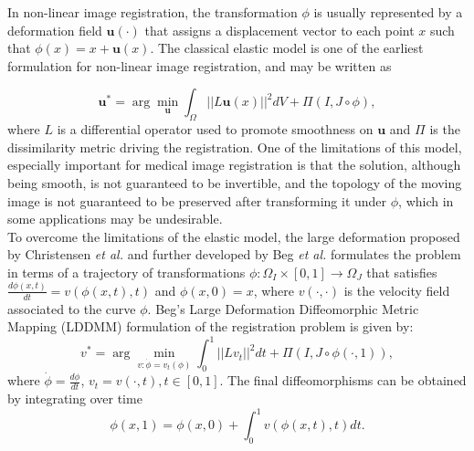 In non-linear image registration, the transformation $\phi$ is usually represented by a deformation field $\mathbf{u(\cdot)}$ that assigns a displacement vector
to each point $x$ such that $\phi(x) = x + \mathbf{u}(x)$. The classical elastic model is one of the earliest formulation for non-linear image registration,
and may be written as

\begin{equation}\label{eq:elastic}
    \mathbf{u}^{*} = \arg \min_{\mathbf{u}} \int_{\Omega} ||L \mathbf{u}(x)||^{2}dV + \Pi(I, J \circ \phi),
\end{equation}
where $L$ is a differential operator used to promote smoothness on $\mathbf{u}$ and $\Pi$ is the dissimilarity metric driving the registration. One of the limitations of this model,
especially important for medical image registration is that the solution, although being smooth, is not guaranteed to be invertible, and the topology of the moving image is not guaranteed to
be preserved after transforming it under $\phi$, which in some applications may be undesirable.\\

To overcome the limitations of the elastic model, the large deformation proposed by  Christensen {\it et al.} \cite{Christensen2001} and further developed by Beg {\it et al.} \cite{Science2005}
formulates the problem in terms of a trajectory of transformations
\hbox{$\phi:\Omega_{I} \times [0, 1] \rightarrow \Omega_{J}$} that satisfies $\frac{d \phi(x, t)}{dt} = v(\phi(x, t), t)$ and $\phi(x, 0) = x$, where $v(\cdot, \cdot)$ is
the velocity field associated to the curve $\phi$. Beg's Large Deformation Diffeomorphic Metric Mapping (LDDMM) \cite{Science2005} formulation of the registration problem is given by:
\begin{equation}\label{eq:LDDMM}
    v^{*} = \arg \min_{v:\dot{\phi} = v_{t}(\phi)} \int_{0}^{1} ||L v_{t}||^{2} dt + \Pi(I, J \circ \phi(\cdot, 1)),
\end{equation}
where $\dot{\phi} = \frac{d\phi}{dt}$, $v_{t} = v(\cdot, t), t\in [0, 1]$. The final diffeomorphisms can be obtained by integrating over time
\begin{equation}\label{eq:velocity_integral}
    \phi(x, 1) = \phi(x, 0) + \int_{0}^{1}v(\phi(x, t), t) dt.
\end{equation}

